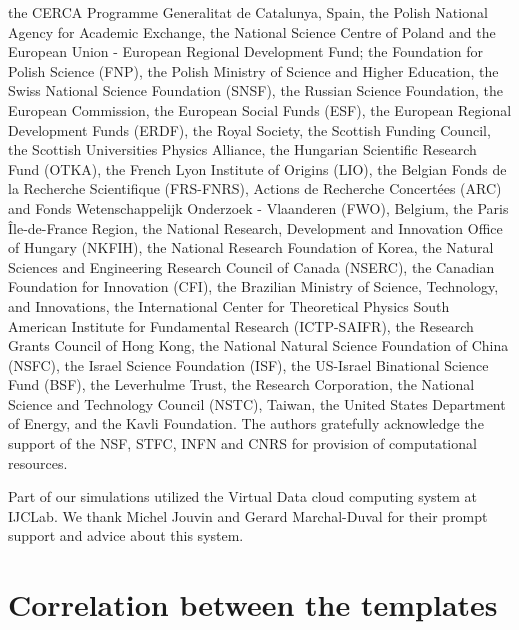 \documentclass[aps,prd,twocolumn,superscriptaddress,nofootinbib, longbibliography]{revtex4-2}
\begin{document}
\begin{acknowledgments}
the CERCA Programme Generalitat de Catalunya, Spain,
the Polish National Agency for Academic Exchange,
the National Science Centre of Poland and the European Union - European Regional
Development Fund;
the Foundation for Polish Science (FNP),
the Polish Ministry of Science and Higher Education,
the Swiss National Science Foundation (SNSF),
the Russian Science Foundation,
the European Commission,
the European Social Funds (ESF),
the European Regional Development Funds (ERDF),
the Royal Society, 
the Scottish Funding Council, 
the Scottish Universities Physics Alliance, 
the Hungarian Scientific Research Fund (OTKA),
the French Lyon Institute of Origins (LIO),
the Belgian Fonds de la Recherche Scientifique (FRS-FNRS), 
Actions de Recherche Concert\'ees (ARC) and
Fonds Wetenschappelijk Onderzoek - Vlaanderen (FWO), Belgium,
the Paris \^{I}le-de-France Region, 
the National Research, Development and Innovation Office of Hungary (NKFIH), 
the National Research Foundation of Korea,
the Natural Sciences and Engineering Research Council of Canada (NSERC),
the Canadian Foundation for Innovation (CFI),
the Brazilian Ministry of Science, Technology, and Innovations,
the International Center for Theoretical Physics South American Institute for Fundamental Research (ICTP-SAIFR), 
the Research Grants Council of Hong Kong,
the National Natural Science Foundation of China (NSFC),
the Israel Science Foundation (ISF),
the US-Israel Binational Science Fund (BSF),
the Leverhulme Trust, 
the Research Corporation,
the National Science and Technology Council (NSTC), Taiwan,
the United States Department of Energy,
and
the Kavli Foundation.
The authors gratefully acknowledge the support of the NSF, STFC, INFN and CNRS for provision of computational resources.

Part of our simulations utilized the Virtual Data cloud computing system at IJCLab. We thank Michel Jouvin and Gerard Marchal-Duval for their prompt support and advice about this system.
\end{acknowledgments}

\appendix
\section{Correlation between the templates}\label{appendix}
\end{document}
